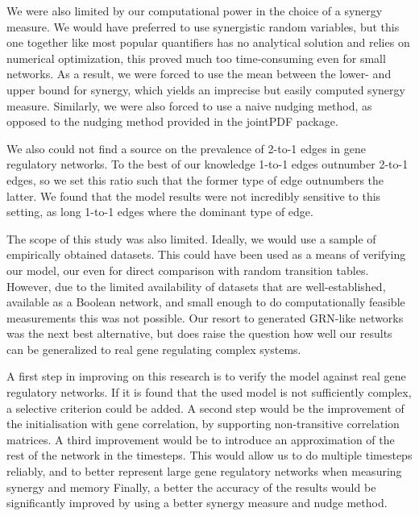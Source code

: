 \documentclass[../main.tex]{subfiles}
\begin{document}
We were also limited by our computational power in the choice of a synergy measure.
We would have preferred to use synergistic random variables, but this one together like most popular quantifiers has no analytical solution and relies on numerical optimization, this proved much too time-consuming even for small networks.
As a result, we were forced to use the mean between the lower- and upper bound for synergy, which yields an imprecise but easily computed synergy measure.
Similarly, we were also forced to use a naive nudging method, as opposed to the nudging method provided in the jointPDF package.

We also could not find a source on the prevalence of 2-to-1 edges in gene regulatory networks.
To the best of our knowledge 1-to-1 edges outnumber 2-to-1 edges, so we set this ratio such that the former type of edge outnumbers the latter.
We found that the model results were not incredibly sensitive to this setting, as long 1-to-1 edges where the dominant type of edge.

The scope of this study was also limited.
Ideally, we would use a sample of empirically obtained datasets.
This could have been used as a means of verifying our model, our even for direct comparison with random transition tables. %
However, due to the limited availability of datasets that are well-established, available as a Boolean network, and small enough to do computationally feasible measurements this was not possible.
Our resort to generated GRN-like networks was the next best alternative, but does raise the question how well our results can be generalized to real gene regulating complex systems.


A first step in improving on this research is to verify the model against real gene regulatory networks.
If it is found that the used model is not sufficiently complex, a selective criterion could be added.
A second step would be the improvement of the initialisation with gene correlation, by supporting non-transitive correlation matrices.
A third improvement would be to introduce an approximation of the rest of the network in the timesteps.
This would allow us to do multiple timesteps reliably, and to better represent large gene regulatory networks when measuring synergy and memory %
Finally, a better the accuracy of the results would be significantly improved by using a better synergy measure and nudge method.
\end{document}
